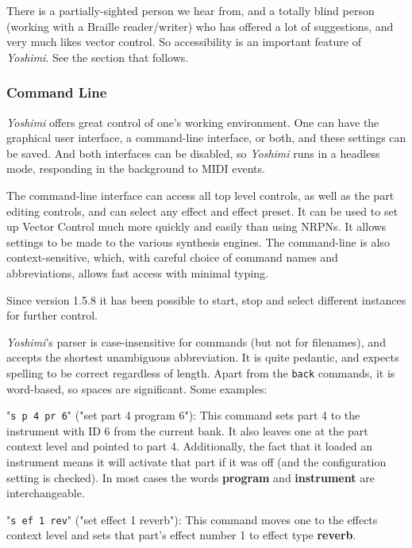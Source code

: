 \documentclass[
 11pt,
 twoside,
 a4paper,
 final                                 %
]{article}
\begin{document}
   There is a partially-sighted person we hear from, and
   a totally blind person (working with a Braille reader/writer) who has
   offered a lot of suggestions, and very much likes vector control.  So
   accessibility  is an important feature of
   \textsl{Yoshimi}.  See the section that follows.

\subsubsection{Command Line}
\label{subsubsec:new_features_command_line}

   \textsl{Yoshimi} offers great control of one's working environment.
   One can have the graphical user interface, a command-line
   interface, or both, and these settings can be saved.  And both
   interfaces can be disabled, so \textsl{Yoshimi} runs in a headless
   mode, responding in the background to MIDI events.

   The command-line interface can access all top level controls, as well as the
   part editing controls, and can select any effect and effect preset.  It can be
   used to set up Vector Control much more quickly and easily than using NRPNs.
   It allows settings to be made to the various synthesis engines.
   The command-line is also context-sensitive, which, with careful choice
   of command names and abbreviations, allows fast access with minimal
   typing.

   Since version 1.5.8 it has been possible to start, stop and select
   different instances for further control.

   \textsl{Yoshimi}'s parser is case-insensitive for commands (but not for
   filenames), and accepts the shortest unambiguous abbreviation. It is
   quite pedantic, and expects spelling to be correct regardless of length.
   Apart from the \texttt{back} commands, it is word-based, so spaces are
   significant.  Some examples:

   "\texttt{s p 4 pr 6}" ("set part 4 program 6"):
   This command sets part 4 to the instrument with ID 6 from the current bank.
   It also leaves one at the part context level and pointed to part 4.
   Additionally, the fact that it loaded an instrument means it will activate
   that part if it was off (and the configuration setting is checked). In most
   cases the words \textbf{program} and \textbf{instrument} are interchangeable.

   "\texttt{s ef 1 rev}" ("set effect 1 reverb"):
   This command moves one to the effects context level and sets that part's
   effect number 1 to effect type \textbf{reverb}.
\end{document}
